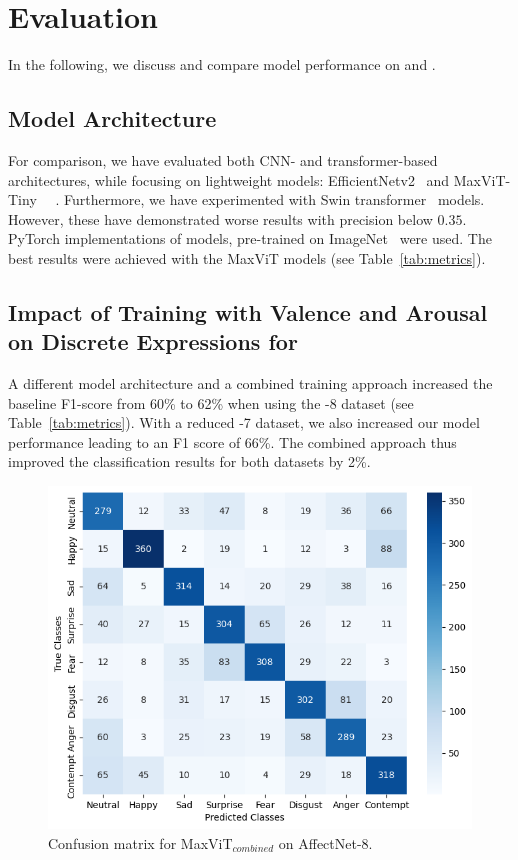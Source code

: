 \section{Evaluation}
In the following, we discuss and compare model performance on \affectnet{} and \emotic{}. 

\subsection{Model Architecture}

For comparison, we have evaluated both CNN- and transformer-based architectures, while focusing on lightweight models: EfficientNetv2~\cite{tan2021efficientnetv2} and %
MaxViT-Tiny ~\cite{tu2022maxvit}~\cite{pytorchmaxvit}. Furthermore, we have experimented with Swin transformer~\cite{liu2021swin} models. However, these have demonstrated worse results with precision below $0.35$. PyTorch implementations of models, pre-trained on ImageNet~\cite{deng2009imagenet} were used.  The best results were achieved with the MaxViT models (see Table~\ref{tab:metrics}).

\subsection{Impact of Training with Valence and Arousal on Discrete Expressions for \affectnet{}}

A different model architecture and a combined training approach increased the baseline F1-score from 60\% to 62\% when using the \affectnet{}-8 dataset (see Table~\ref{tab:metrics}). With a reduced \affectnet{}-7 dataset, we also increased our model performance leading to an F1 score of 66\%.  The combined approach thus improved the classification results for both datasets by 2\%. 

\begin{figure}[b]
    \centering
    \includegraphics[width = 0.9\columnwidth]{pictures/confusion_8VA.png}
    \caption{Confusion matrix for MaxViT$_{combined}$ on AffectNet-8.}
    \label{fig:confusion_matrix_classifier}
\end{figure}

